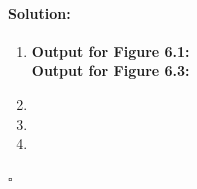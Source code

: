 \documentclass[11pt,letterpaper]{article}
\newif \iftemplate \templatetrue
\newenvironment{solution}{\paragraph{Solution:}}{\hfill$\square$}
\theoremstyle{definition}
\begin{document}
\begin{enumerate}
\iftemplate
\begin{solution}
\begin{enumerate}[label=(\alph*)]
\item 
\textbf{Output for Figure 6.1:} \\
\textbf{Output for Figure 6.3:}
\item 
\item
\item 
\end{enumerate}
\end{solution}
\newpage
\fi


\end{enumerate}
\end{document}
